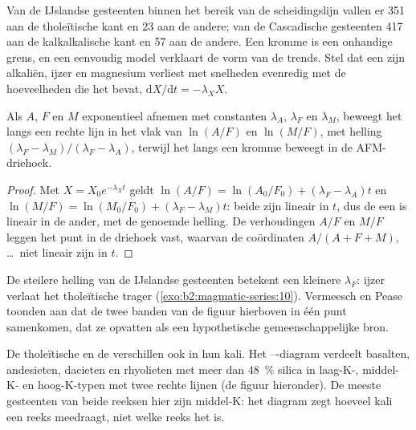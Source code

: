 Van de IJslandse gesteenten binnen het bereik van de scheidingslijn vallen er 351 aan de
tholeïtische kant en 23 aan de andere; van de Cascadische gesteenten 417 aan de kalkalkalische
kant en 57 aan de andere. Een kromme is een onhandige grens, en een eenvoudig model verklaart
de vorm van de trends. Stel dat een  zijn alkaliën, ijzer en magnesium verliest
met snelheden evenredig met de hoeveelheden die het bevat, $\mathrm dX/\mathrm dt = -\lambda_X X$.

\begin{proposition}\label{prop:b2:magmatic-series:logratio}
Als $A$, $F$ en $M$ exponentieel afnemen met constanten $\lambda_A$, $\lambda_F$ en
$\lambda_M$, beweegt het  langs een rechte lijn in het vlak van $\ln(A/F)$ en
$\ln(M/F)$, met helling $(\lambda_F - \lambda_M)/(\lambda_F - \lambda_A)$, terwijl het
langs een kromme beweegt in de AFM-driehoek.
\end{proposition}

\begin{proof}
Met $X = X_0 e^{-\lambda_X t}$ geldt $\ln(A/F) = \ln(A_0/F_0) + (\lambda_F - \lambda_A)t$
en $\ln(M/F) = \ln(M_0/F_0) + (\lambda_F - \lambda_M)t$: beide zijn lineair in $t$, dus
de een is lineair in de ander, met de genoemde helling. De verhoudingen $A/F$ en $M/F$ leggen het
punt in de driehoek vast, waarvan de coördinaten $A/(A + F + M)$, \dots\ niet lineair zijn in $t$.
\end{proof}

De steilere helling van de IJslandse gesteenten betekent een kleinere $\lambda_F$: ijzer verlaat
het tholeïtische  trager (\cref{exo:b2:magmatic-series:10}). Vermeesch en Pease toonden aan dat de twee
banden van de figuur hierboven in één punt samenkomen, dat ze opvatten als een hypothetische gemeenschappelijke
bron.

De tholeïtische en de  verschillen ook in hun kali. Het
---diagram verdeelt basalten, andesieten, dacieten en rhyolieten met
meer dan \qty{48}{\percent} silica in laag-K-, middel-K- en hoog-K-typen met twee
rechte lijnen (de figuur hieronder). De meeste gesteenten van beide reeksen hier zijn middel-K: het
diagram zegt hoeveel kali een reeks meedraagt, niet welke reeks het is.

